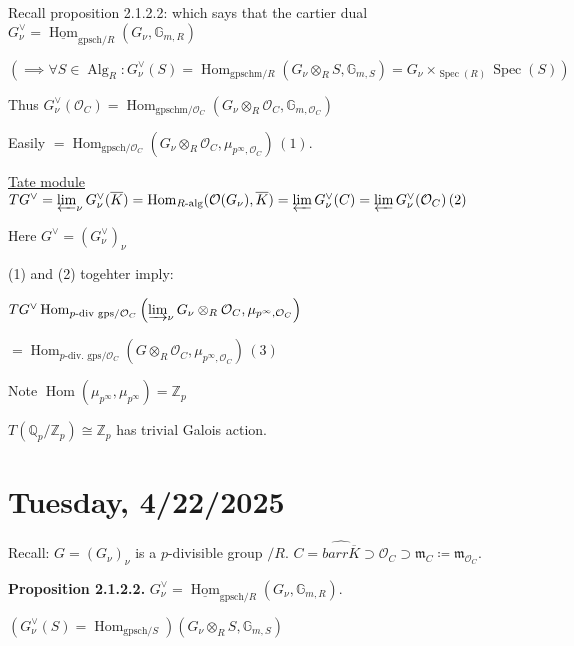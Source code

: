 \documentclass{article}
\theoremstyle{definition}
\numberwithin{theorem}{subsection}
\begin{document}
    Recall proposition 2.1.2.2: which says that the cartier dual \(G_\nu^\vee = \underline{\operatorname{Hom}}_{\text{gpsch/}R} (G_\nu, \mathbb{G}_{m,R})\)
    
    \((\implies \forall S \in \operatorname{Alg}_R: G_\nu^\vee(S) = \operatorname{Hom}_{\text{gpschm/}R} (G_\nu \otimes_R S, \mathbb{G}_{m,S})= G_\nu \times_{\operatorname{Spec}(R)} \operatorname{Spec}(S))\) 

    Thus \(G_\nu^\vee(\mathcal{O}_C) = \operatorname{Hom}_{\text{gpschm/}\mathcal{O}_C}(G_\nu \otimes_R \mathcal{O}_C, \mathbb{G}_{m, \mathcal{O}_C})\)
    
    Easily \(= \operatorname{Hom}_{\text{gpsch/} \mathcal{O}_C} (G_\nu \otimes_R \mathcal{O}_C, \mu_{p^{\infty}, \mathcal{O}_C})\, (1)\).

    \underline{Tate module} \(T G^\vee = \varprojlim_\nu G^\vee_\nu(\overline{K}) = \operatorname{Hom}_{R\text{-alg}}(\mathcal{O}(G_\nu), \overline{K}) = \varprojlim G_\nu^\vee(C) = \varprojlim G_\nu^\vee(\mathcal{O}_C) \, (2)\)

    Here \(G^\vee = (G_\nu^\vee)_\nu\) 

    (1) and (2) togehter imply:

    \(T G^\vee \operatorname{Hom}_{p \text{-div gps} / \mathcal{O}_C} \left( \varinjlim_\nu G_\nu \otimes_R \mathcal{O}_C, \mu_{p^{\infty}, \mathcal{O}_C} \right)\)
    
    \(= \operatorname{Hom}_{p \text{-div. gps} / \mathcal{O}_C} \left( G \otimes_R \mathcal{O}_C, \mu_{p^{\infty}, \mathcal{O}_C} \right)\, (3)\)
    
    Note \(\operatorname{Hom}(\mu_{p^{\infty}}, \mu_{p^{\infty}}) = \mathbb{Z}_p\)
    
    \(T(\mathbb{Q}_p / \mathbb{Z}_p) \cong \mathbb{Z}_p\) has trivial Galois action.

    \section*{Tuesday, 4/22/2025}
    
    Recall: \(G = (G_\nu)_\nu\) is a \(p\)-divisible group \(/ R\). \(C = \widehat{barr\overline{K}} \supset \mathcal{O}_C \supset \mathfrak{m}_C \coloneqq \mathfrak{m}_{\mathcal{O}_C}\).
    
    \textbf{Proposition 2.1.2.2.} \(G_\nu^\vee = \underline{\operatorname{Hom}}_{\text{gpsch} / R} (G_\nu, \mathbb{G}_{m,R})\).
    
    \((G_\nu^\vee(S) = \operatorname{Hom}_{\text{gpsch} / S})(G_\nu \otimes_R S, \mathbb{G}_{m,S})\)
    
\end{document}
